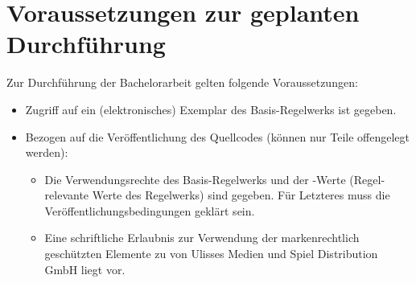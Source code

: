 \section{Voraussetzungen zur geplanten Durchführung}
\label{sec:voraussetzungen-zur-geplanten-durchfuhrung}

Zur Durchführung der Bachelorarbeit gelten folgende Voraussetzungen:

\begin{itemize}
    \item Zugriff auf ein (elektronisches) Exemplar des Basis-Regelwerks ist gegeben.
    \item Bezogen auf die Veröffentlichung des Quellcodes (\ggfs können nur Teile offengelegt werden):
    \begin{itemize}
        \item Die Verwendungsrechte des Basis-Regelwerks und der -Werte (Regel-relevante Werte des Regelwerks) sind gegeben.
        Für Letzteres muss \insb die Veröffentlichungsbedingungen geklärt sein.
        \item Eine schriftliche Erlaubnis zur Verwendung der markenrechtlich geschützten Elemente zu  von Ulisses Medien und Spiel Distribution GmbH liegt vor.
    \end{itemize}
\end{itemize}


